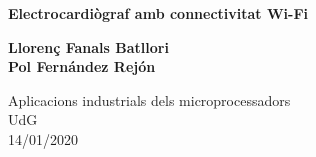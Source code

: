 \begin{titlepage}
	\begin{center}
		\vspace*{1cm}
		
		\Huge
		\textbf{Electrocardiògraf amb connectivitat Wi-Fi}
		
		\vspace{0.5cm}
		\LARGE
	
		\vspace{1.5cm}
		
		\textbf{Llorenç Fanals Batllori \\ Pol Fernández Rejón}
		
		\vfill
		
		\small
		
		\vspace{1cm}
		
	\end{center}
	
	\begin{flushright}
	\large	
	Aplicacions industrials dels microprocessadors\\
	UdG\\
	14/01/2020
	\end{flushright}
	


\end{titlepage}